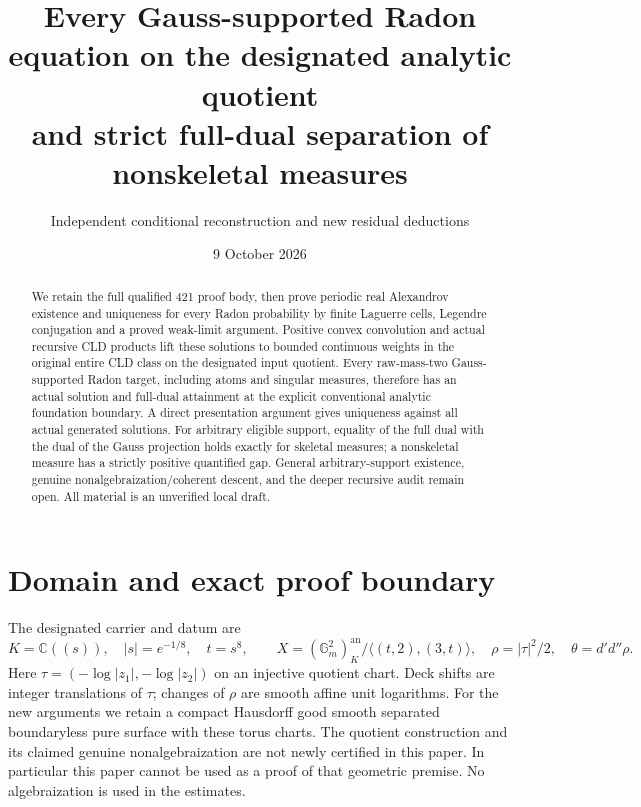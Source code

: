 \documentclass[11pt]{article}
\title{Every Gauss-supported Radon equation on the designated analytic quotient\\and strict full-dual separation of nonskeletal measures}
\author{Independent conditional reconstruction and new residual deductions}
\date{9 October 2026}
\newcommand{\DD}{d'd''}
\begin{document}
\maketitle
\begin{abstract}
We retain the full qualified 421 proof body, then prove periodic real
Alexandrov existence and uniqueness for every Radon probability by
finite Laguerre cells, Legendre conjugation and a proved weak-limit
argument. Positive convex convolution and actual recursive CLD products
lift these solutions to bounded continuous weights in the original
entire CLD class on the designated input quotient. Every raw-mass-two
Gauss-supported Radon target, including atoms and singular measures,
therefore has an actual solution and full-dual attainment at the explicit
conventional analytic foundation boundary. A direct presentation argument
gives uniqueness against all actual generated solutions. For arbitrary
eligible support, equality of the full dual with the dual of the Gauss
projection holds exactly for skeletal measures; a nonskeletal measure has
a strictly positive quantified gap. General arbitrary-support existence,
genuine nonalgebraization/coherent descent, and the deeper recursive audit
remain open. All material is an unverified local draft.
\end{abstract}

\section{Domain and exact proof boundary}
The designated carrier and datum are
\[
 K=\mathbb C((s)),\quad |s|=e^{-1/8},\quad t=s^8,\qquad
 X=(\mathbb G_m^2)^{\mathrm{an}}_K/\langle(t,2),(3,t)\rangle,
 \quad \rho=|\tau|^2/2,\quad\theta=\DD\rho.
\]
Here $\tau=(-\log|z_1|,-\log|z_2|)$ on an injective quotient
chart. Deck shifts are integer translations of $\tau$; changes of
$\rho$ are smooth affine unit logarithms. For the new arguments we
retain a compact Hausdorff good smooth separated boundaryless pure
surface with these torus charts. The quotient construction and its
claimed genuine nonalgebraization are not newly certified in this paper.
In particular this paper cannot be used as a proof of that geometric
premise. No algebraization is used in the estimates.
\end{document}
